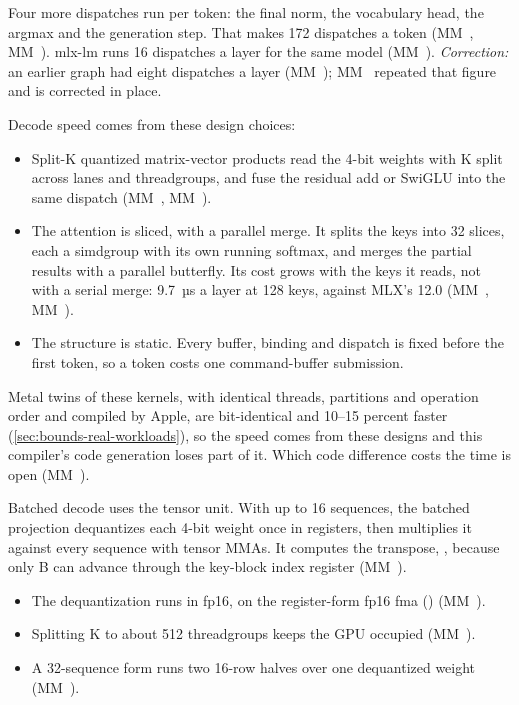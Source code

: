 Four more dispatches run per token: the final norm, the vocabulary head, the argmax and the generation step. That
makes 172 dispatches a token (MM~, MM~). mlx-lm runs 16 dispatches a layer for the same model
(MM~). \emph{Correction:} an earlier graph had eight dispatches a layer (MM~); MM~ repeated that figure
and is corrected in place.

Decode speed comes from these design choices:

\begin{itemize}
\item Split-K quantized matrix-vector products read the 4-bit weights with K split across lanes and
  threadgroups, and fuse the residual add or SwiGLU into the same dispatch (MM~, MM~).
\item The attention is sliced, with a parallel merge. It splits the keys into 32 slices, each a simdgroup with
  its own running softmax, and merges the partial results with a parallel butterfly. Its cost grows with the keys
  it reads, not with a serial merge: 9.7~µs a layer at 128 keys, against MLX's 12.0 (MM~, MM~).
\item The structure is static. Every buffer, binding and dispatch is fixed before the first token, so a token costs one
  command-buffer submission.
\end{itemize}

Metal twins of these kernels, with identical threads, partitions and operation order and compiled by Apple, are
bit-identical and 10–15 percent faster (\cref{sec:bounds-real-workloads}), so the speed comes from these designs and
this compiler's code generation loses part of it. Which code difference costs the time is open (MM~).

Batched decode uses the tensor unit. With up to 16 sequences, the batched projection dequantizes each
4-bit weight once in registers, then multiplies it against every sequence with tensor MMAs. It computes the
transpose, , because only B can advance through the key-block index register (MM~).

\begin{itemize}
\item The dequantization runs in fp16, on the register-form fp16 fma () (MM~).
\item Splitting K to about 512 threadgroups keeps the GPU occupied (MM~).
\item A 32-sequence form runs two 16-row halves over one dequantized weight (MM~).
\end{itemize}

